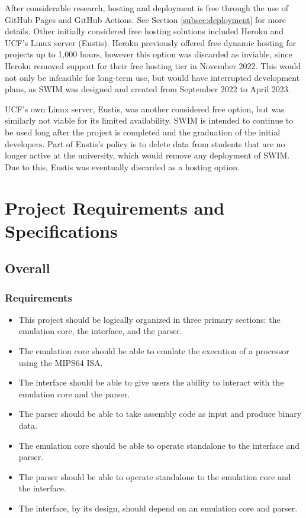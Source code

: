 \documentclass[
    paper=letter,
    parskip=half,
    fontsize=12pt,
    titlepage=firstiscover,
    toc=bibliography,
    numbers=endperiod
]{scrartcl}
\let\oldsection\section
\renewcommand{\section}{\newpage\oldsection}
\begin{document}
After considerable research, hosting and deployment is free through the
use of GitHub Pages and GitHub Actions. See Section
\ref{subsec:deployment} for more details. Other initially considered
free hosting solutions included Heroku and UCF's Linux server (Eustis).
Heroku previously offered free dynamic hosting for projects up to 1,000
hours, however this option was discarded as inviable, since Heroku
removed support for their free hosting tier in November 2022. This would
not only be infeasible for long-term use, but would have interrupted
development plans, as SWIM was designed and created from September 2022
to April 2023.

UCF's own Linux server, Eustis, was another considered free option, but
was similarly not viable for its limited availability. SWIM is intended
to continue to be used long after the project is completed and the
graduation of the initial developers. Part of Eustis's policy is to
delete data from students that are no longer active at the university,
which would remove any deployment of SWIM. Due to this, Eustis was
eventually discarded as a hosting option.

\section{Project Requirements and Specifications}
\subsection{Overall}
\subsubsection{Requirements}
\begin{itemize}
    \item This project should be logically organized in three primary sections:
          the emulation core, the interface, and the parser.
    \item The emulation core should be able to emulate the execution of a
          processor using the MIPS64 ISA.
    \item The interface should be able to give users the ability to interact with
          the emulation core and the parser.
    \item The parser should be able to take assembly code as input and produce
          binary data.
    \item The emulation core should be able to operate standalone to the interface
          and parser.
    \item The parser should be able to operate standalone to the emulation core
          and the interface.
    \item The interface, by its design, should depend on an emulation core and
          parser.
\end{itemize}
\end{document}
